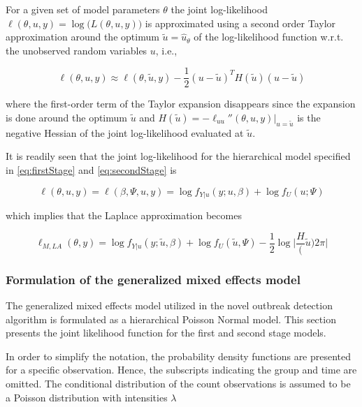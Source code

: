 \documentclass[preprint, 3p,
authoryear]{elsarticle} %
\begin{document}
For a given set of model parameters \(\theta\) the joint log-likelihood
\(\ell(\theta, u, y)=\log\big(L(\theta, u, y)\big)\) is approximated
using a second order Taylor approximation around the optimum
\(\tilde{u}=\hat{u}_\theta\) of the log-likelihood function w.r.t. the
unobserved random variables \(u\), i.e.,

\begin{equation}\label{eq:laplaceApprox}
  \ell(\theta, u, y)\approx\ell(\theta, \tilde{u}, y) - \frac{1}{2}(u-\tilde{u})^T H(\tilde{u})(u-\tilde{u})
\end{equation}

where the first-order term of the Taylor expansion disappears since the
expansion is done around the optimum \(\tilde {u}\) and
\(H(\tilde{u})=-\ell_{uu}''(\theta, u, y)|_{u=\tilde{u}}\) is the
negative Hessian of the joint log-likelihood evaluated at \(\tilde{u}\).

It is readily seen that the joint log-likelihood for the hierarchical
model specified in \ref{eq:firstStage} and \ref{eq:secondStage} is

\begin{equation}
  \ell(\theta, u, y) = \ell(\beta, \Psi, u, y) = \log f_{Y|u}(y;u,\beta)+\log f_U(u;\Psi)
\end{equation}

which implies that the Laplace approximation becomes

\begin{equation}
  \ell_{M,LA}(\theta, y)=\log f_{Y|u}(y; \tilde{u},\beta)+\log f_U(\tilde{u}, \Psi)-\frac{1}{2}\log\Bigg|\frac{H}(\tilde{u}){2\pi}\Bigg|
\end{equation}

\hypertarget{formulation-of-the-generalized-mixed-effects-model}{%
\subsubsection{Formulation of the generalized mixed effects
model}\label{formulation-of-the-generalized-mixed-effects-model}}

The generalized mixed effects model utilized in the novel outbreak
detection algorithm is formulated as a hierarchical Poisson Normal
model. This section presents the joint likelihood function for the first
and second stage models.

In order to simplify the notation, the probability density functions are
presented for a specific observation. Hence, the subscripts indicating
the group and time are omitted. The conditional distribution of the
count observations is assumed to be a Poisson distribution with
intensities \(\lambda\)
\end{document}
